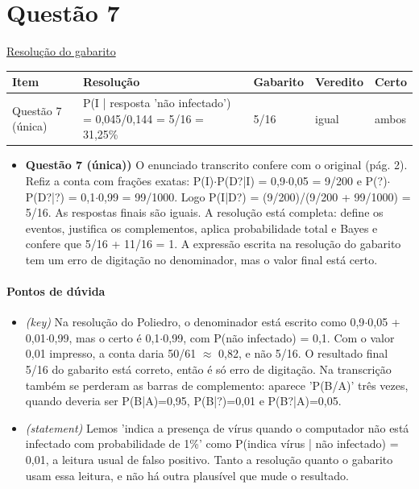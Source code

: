 \documentclass{article}%
\begin{document}
\section*{Questão 7}%
\href{https://poliedroresolve.sistemapoliedro.com.br/vestibulares/ime/2026/ime-2-fase-dia-1-23-10-2025-2-fase-dia-1/dissertativa-7-matematica-2-fase-dia-1-ime-2026}{Resolução do gabarito}\par\smallskip%
\begin{longtable}{@{}p{} p{} p{} p{} p{}@{}}\toprule Item & Resolução & Gabarito & Veredito & Certo \\ \midrule
Questão 7 (única) & P(I | resposta 'não infectado') = 0,045/0,144 = 5/16 = 31,25\% & 5/16 & igual & ambos \\
\bottomrule\end{longtable}%
\begin{itemize}%
\item%
\textbf{Questão 7 (única))} O enunciado transcrito confere com o original (pág. 2). Refiz a conta com frações exatas: P(I)$\cdot$P(D?|I) = 0,9$\cdot$0,05 = 9/200 e P(?)$\cdot$P(D?|?) = 0,1$\cdot$0,99 = 99/1000. Logo P(I|D?) = (9/200)/(9/200 + 99/1000) = 5/16. As respostas finais são iguais. A resolução está completa: define os eventos, justifica os complementos, aplica probabilidade total e Bayes e confere que 5/16 + 11/16 = 1. A expressão escrita na resolução do gabarito tem um erro de digitação no denominador, mas o valor final está certo.%
\end{itemize}%
\paragraph{Pontos de dúvida}%
\begin{itemize}%
\item%
\textit{(key)} Na resolução do Poliedro, o denominador está escrito como 0,9$\cdot$0,05 + 0,01$\cdot$0,99, mas o certo é 0,1$\cdot$0,99, com P(não infectado) = 0,1. Com o valor 0,01 impresso, a conta daria 50/61 $\approx$ 0,82, e não 5/16. O resultado final 5/16 do gabarito está correto, então é só erro de digitação. Na transcrição também se perderam as barras de complemento: aparece 'P(B/A)' três vezes, quando deveria ser P(B|A)=0,95, P(B|?)=0,01 e P(B?|A)=0,05.%
\item%
\textit{(statement)} Lemos 'indica a presença de vírus quando o computador não está infectado com probabilidade de 1\%' como P(indica vírus | não infectado) = 0,01, a leitura usual de falso positivo. Tanto a resolução quanto o gabarito usam essa leitura, e não há outra plausível que mude o resultado.%
\end{itemize}%
\end{document}
